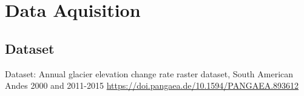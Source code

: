 \section{Data Aquisition}
\subsection{Dataset}
Dataset: Annual glacier elevation change rate raster dataset, South American Andes 2000 and 2011-2015
\url{https://doi.pangaea.de/10.1594/PANGAEA.893612}
